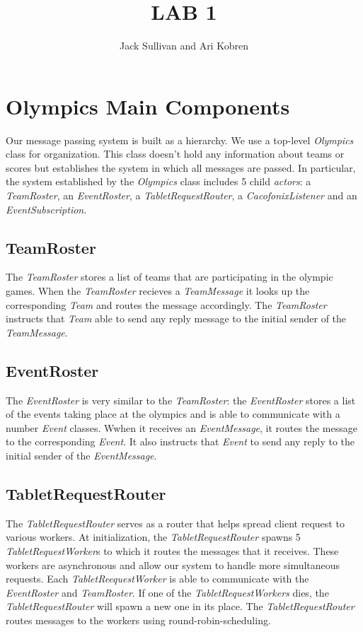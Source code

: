 \documentclass[11pt]{article}
\begin{document}
\title{LAB 1}
\author{Jack Sullivan and Ari Kobren}
\maketitle

\section{Olympics Main Components}
Our message passing system is built as a hierarchy. We use a top-level
\emph{Olympics} class for organization.  This class doesn't hold any
information about teams or scores but establishes the system in which
all messages are passed.  In particular, the system established by the
\emph{Olympics} class includes 5 child \emph{actors}: a
\emph{TeamRoster}, an \emph{EventRoster}, a
\emph{TabletRequestRouter}, a \emph{CacofonixListener} and an
\emph{EventSubscription}.

\subsection{TeamRoster}
The \emph{TeamRoster} stores a list of teams that are participating
in the olympic games.  When the \emph{TeamRoster} recieves a
\emph{TeamMessage} it looks up the corresponding \emph{Team} and
routes the message accordingly.  The \emph{TeamRoster} instructs that
\emph{Team} able to send any reply message to the initial sender of
the \emph{TeamMessage}.

\subsection{EventRoster}
The \emph{EventRoster} is very similar to the \emph{TeamRoster}: the
\emph{EventRoster} stores a list of the events taking place at the
olympics and is able to communicate with a number \emph{Event}
classes.  Wwhen it receives an \emph{EventMessage}, it routes the
message to the corresponding \emph{Event}.  It also instructs that
\emph{Event} to send any reply to the initial sender of the
\emph{EventMessage}.

\subsection{TabletRequestRouter}
The \emph{TabletRequestRouter} serves as a router that helps spread
client request to various workers.  At initialization, the
\emph{TabletRequestRouter} spawns 5 \emph{TabletRequestWorker}s to
which it routes the messages that it receives.  These workers are
asynchronous and allow our system to handle more simultaneous
requests.  Each \emph{TabletReequestWorker} is able to communicate
with the \emph{EventRoster} and \emph{TeamRoster}. If one of the
\emph{TabletRequestWorkers} dies, the \emph{TabletRequestRouter} will
spawn a new one in its place. The \emph{TabletRequestRouter} routes
messages to the workers using round-robin-scheduling.
\end{document}
